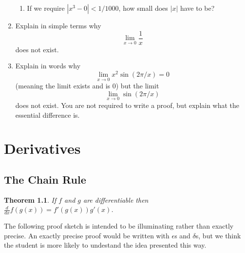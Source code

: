 \documentclass[11pt]{book}
\newtheorem{theorem}{Theorem}
\numberwithin{example}{chapter}
\begin{document}
\begin{enumerate}
\begin{enumerate}
\item
If we require $|x^3-0|<1/1000$, how small does $|x|$ have to be?  



\end{enumerate}

\item

Explain in simple terms why $$\lim_{x\to 0} \frac{1}{x}$$ does not exist.  



\item
Explain in words why $$\lim_{x\to 0} x^2 \sin(2\pi/x)=0$$ (meaning the limit exists and is 0) but the limit $$\lim_{x\to 0} \sin(2\pi/x)$$ does not exist.  You are not required to write a proof, but explain what the essential difference is.









\end{enumerate}




\chapter{Derivatives}  





\section{The Chain Rule}


\begin{theorem}
If $f$ and $g$ are differentiable then $\frac{d}{dx}f(g(x)) = f'(g(x))g'(x)$.
\end{theorem}


The following proof sketch is intended to be illuminating rather than exactly precise.  An exactly precise proof would be written with $\epsilon$s and $\delta$s, but we think the student is more likely to undestand the idea presented this way.
\end{document}
